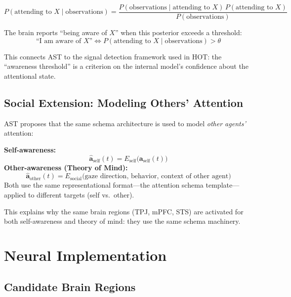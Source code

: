 \documentclass[11pt,a4paper]{report}
\begin{document}
\begin{mathbox}
\vspace{-8pt}
\[
  P(\text{attending to } X \mid \text{observations}) = \frac{P(\text{observations} \mid \text{attending to } X)\, P(\text{attending to } X)}{P(\text{observations})}
\]
\vspace{-10pt}
\end{mathbox}

The brain reports ``being aware of $X$'' when this posterior exceeds a threshold:
\[
  \text{``I am aware of } X\text{''} \iff P(\text{attending to } X \mid \text{observations}) > \theta
\]

This connects AST to the signal detection framework used in HOT: the ``awareness threshold'' is a criterion on the internal model's confidence about the attentional state.

\section{Social Extension: Modeling Others' Attention}

AST proposes that the same schema architecture is used to model \emph{other agents'} attention:

\begin{mathbox}
\vspace{-6pt}
\textbf{Self-awareness:}
\[
  \hat{\mathbf{a}}_{\text{self}}(t) = E_{\text{self}}\bigl(\mathbf{a}_{\text{self}}(t)\bigr)
\]
\textbf{Other-awareness (Theory of Mind):}
\[
  \hat{\mathbf{a}}_{\text{other}}(t) = E_{\text{social}}\bigl(\text{gaze direction, behavior, context of other agent}\bigr)
\]
Both use the same representational format---the attention schema template---applied to different targets (self vs.\ other).
\vspace{-4pt}
\end{mathbox}

This explains why the same brain regions (TPJ, mPFC, STS) are activated for both self-awareness and theory of mind: they use the same schema machinery.


\chapter{Neural Implementation}

\section{Candidate Brain Regions}
\end{document}
